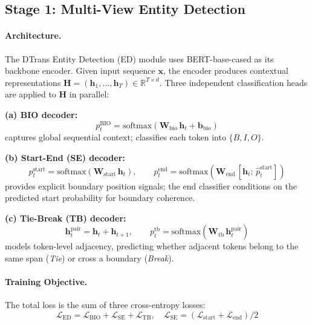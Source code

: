 \documentclass[11pt,a4paper]{article}
\begin{document}
\subsection{Stage 1: Multi-View Entity Detection}

\paragraph{Architecture.} The DTrans Entity Detection (ED) module uses BERT-base-cased as its backbone encoder. Given input sequence $\mathbf{x}$, the encoder produces contextual representations $\mathbf{H} = (\mathbf{h}_1,\ldots,\mathbf{h}_T) \in \mathbb{R}^{T \times d}$. Three independent classification heads are applied to $\mathbf{H}$ in parallel:

\textbf{(a) BIO decoder:}
\begin{equation}
  p^{\text{BIO}}_t = \text{softmax}(\mathbf{W}_{\text{bio}}\,\mathbf{h}_t + \mathbf{b}_{\text{bio}})
  \label{eq:bio}
\end{equation}
captures global sequential context; classifies each token into $\{B, I, O\}$.

\textbf{(b) Start-End (SE) decoder:}
\begin{equation}
  p^{\text{start}}_t = \text{softmax}(\mathbf{W}_{\text{start}}\,\mathbf{h}_t), \qquad
  p^{\text{end}}_t = \text{softmax}(\mathbf{W}_{\text{end}}\,[\mathbf{h}_t;\, \hat{p}^{\text{start}}_t])
  \label{eq:se}
\end{equation}
provides explicit boundary position signals; the end classifier conditions on the predicted start probability for boundary coherence.

\textbf{(c) Tie-Break (TB) decoder:}
\begin{equation}
  \mathbf{h}^{\text{pair}}_t = \mathbf{h}_t + \mathbf{h}_{t+1}, \qquad
  p^{\text{tb}}_t = \text{softmax}(\mathbf{W}_{\text{tb}}\,\mathbf{h}^{\text{pair}}_t)
  \label{eq:tb}
\end{equation}
models token-level adjacency, predicting whether adjacent tokens belong to the same span (\textit{Tie}) or cross a boundary (\textit{Break}).

\paragraph{Training Objective.} The total loss is the sum of three cross-entropy losses:
\begin{equation}
  \mathcal{L}_{\text{ED}} = \mathcal{L}_{\text{BIO}} + \mathcal{L}_{\text{SE}} + \mathcal{L}_{\text{TB}}, \quad
  \mathcal{L}_{\text{SE}} = (\mathcal{L}_{\text{start}} + \mathcal{L}_{\text{end}}) / 2
\end{equation}
\end{document}
